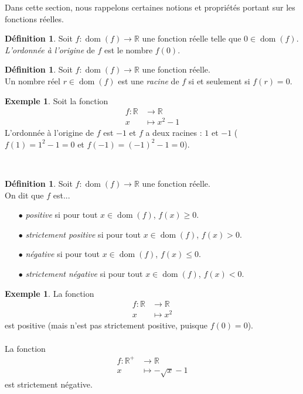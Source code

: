 \documentclass[a4paper,13pt]{scrreprt}
\theoremstyle{plain}
\theoremstyle{definition}
\newtheorem{déf}[subsection]{Définition}
\newtheorem{exe}[subsection]{Exemple}
\newcommand{\rr}{\mathbb{R}}
\DeclareMathOperator{\dom}{dom}
\begin{document}
Dans cette section, nous rappelons certaines notions et propriétés portant sur les fonctions réelles.

\begin{déf}
	Soit $f : \dom(f) \to \rr$ une fonction réelle telle que $0 \in \dom(f)$. \\
	\emph{L'ordonnée à l'origine} de $f$ est le nombre $f(0)$.
\end{déf}

\begin{déf}
	Soit $f : \dom(f) \to \rr$ une fonction réelle. \\
	Un nombre réel $r\in \dom(f)$ est une \emph{racine} de $f$ si et seulement si $f(r)=0$.
\end{déf}

\begin{exe}
	Soit la fonction \begin{align*}
	f : \rr &\to \rr \\
	x &\mapsto x^2 -1
	\end{align*}
	L'ordonnée à l'origine de $f$ est $-1$ et $f$ a deux racines : $1$ et $-1$ ($f(1)=1^2 -1 =0$ et $f(-1) = (-1)^2 - 1 = 0$).
\end{exe}
~~\\
\begin{déf}
	Soit $f : \dom(f) \to \rr$ une fonction réelle. \\
	On dit que $f$ est...
	\begin{itemize}
		\item [$\bullet$] \emph{positive} si pour tout $x \in \dom(f)$, $f(x) \ge 0$.
		\item [$\bullet$] \emph{strictement positive} si pour tout $x \in \dom(f)$, $f(x) > 0$.
		\item [$\bullet$] \emph{négative} si pour tout $x \in \dom(f)$, $f(x) \le 0$.
		\item [$\bullet$] \emph{strictement négative} si pour tout $x \in \dom(f)$, $f(x) < 0$.
	\end{itemize}
\end{déf}

\begin{exe}
	La fonction \begin{align*}
	f : \rr &\to \rr \\
	x &\mapsto x^2
	\end{align*}
	est positive (mais n'est pas strictement positive, puisque $f(0)=0$). \\
	~~\\
	La fonction \begin{align*}
	f : {\rr}^{+} &\to \rr \\
	x &\mapsto -\sqrt{x}-1
	\end{align*}
	est strictement négative.
\end{exe}
\end{document}
